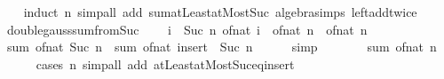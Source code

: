 \begin{isabellebody}
%
\isadelimproof
\ \ %
\endisadelimproof
%
\isatagproof
{}\isamarkupfalse%
\ {\isacharparenleft}{\kern0pt}induct\ n{\isacharparenright}{\kern0pt}\ {\isacharparenleft}{\kern0pt}simp{\isacharunderscore}{\kern0pt}all\ add{\isacharcolon}{\kern0pt}\ sum{\isachardot}{\kern0pt}atLeast{}{\isacharunderscore}{\kern0pt}atMost{\isacharunderscore}{\kern0pt}Suc\ algebra{\isacharunderscore}{\kern0pt}simps\ left{\isacharunderscore}{\kern0pt}add{\isacharunderscore}{\kern0pt}twice{\isacharparenright}{\kern0pt}%
\endisatagproof
{\isafoldproof}%
%
\isadelimproof
\isanewline
%
\endisadelimproof
\isanewline
{}\isamarkupfalse%
\ double{\isacharunderscore}{\kern0pt}gauss{\isacharunderscore}{\kern0pt}sum{\isacharunderscore}{\kern0pt}from{\isacharunderscore}{\kern0pt}Suc{\isacharunderscore}{\kern0pt}{}{\isacharcolon}{\kern0pt}\isanewline
\ \ {\isachardoublequoteopen}{}\ {\isacharasterisk}{\kern0pt}\ {\isacharparenleft}{\kern0pt}{\isasymSum}i\ {\isacharequal}{\kern0pt}\ Suc\ {}{\isachardot}{\kern0pt}{\isachardot}{\kern0pt}n{\isachardot}{\kern0pt}\ of{\isacharunderscore}{\kern0pt}nat\ i{\isacharparenright}{\kern0pt}\ {\isacharequal}{\kern0pt}\ of{\isacharunderscore}{\kern0pt}nat\ n\ {\isacharasterisk}{\kern0pt}\ {\isacharparenleft}{\kern0pt}of{\isacharunderscore}{\kern0pt}nat\ n\ {\isacharplus}{\kern0pt}\ {}{\isacharparenright}{\kern0pt}{\isachardoublequoteclose}\isanewline
%
\isadelimproof
%
\endisadelimproof
%
\isatagproof
{}\isamarkupfalse%
\ {\isacharminus}{\kern0pt}\isanewline
\ \ \isamarkupfalse%
\ {\isachardoublequoteopen}sum\ of{\isacharunderscore}{\kern0pt}nat\ {\isacharbraceleft}{\kern0pt}Suc\ {}{\isachardot}{\kern0pt}{\isachardot}{\kern0pt}n{\isacharbraceright}{\kern0pt}\ {\isacharequal}{\kern0pt}\ sum\ of{\isacharunderscore}{\kern0pt}nat\ {\isacharparenleft}{\kern0pt}insert\ {}\ {\isacharbraceleft}{\kern0pt}Suc\ {}{\isachardot}{\kern0pt}{\isachardot}{\kern0pt}n{\isacharbraceright}{\kern0pt}{\isacharparenright}{\kern0pt}{\isachardoublequoteclose}\isanewline
\ \ \ \ \isamarkupfalse%
\ simp\isanewline
\ \ \isamarkupfalse%
\ \isamarkupfalse%
\ {\isachardoublequoteopen}{\isasymdots}\ {\isacharequal}{\kern0pt}\ sum\ of{\isacharunderscore}{\kern0pt}nat\ {\isacharbraceleft}{\kern0pt}{}{\isachardot}{\kern0pt}{\isachardot}{\kern0pt}n{\isacharbraceright}{\kern0pt}{\isachardoublequoteclose}\isanewline
\ \ \ \ \isamarkupfalse%
\ {\isacharparenleft}{\kern0pt}cases\ n{\isacharparenright}{\kern0pt}\ {\isacharparenleft}{\kern0pt}simp{\isacharunderscore}{\kern0pt}all\ add{\isacharcolon}{\kern0pt}\ atLeast{}{\isacharunderscore}{\kern0pt}atMost{\isacharunderscore}{\kern0pt}Suc{\isacharunderscore}{\kern0pt}eq{\isacharunderscore}{\kern0pt}insert{\isacharunderscore}{\kern0pt}{}{\isacharparenright}{\kern0pt}\isanewline

\end{isabellebody}
